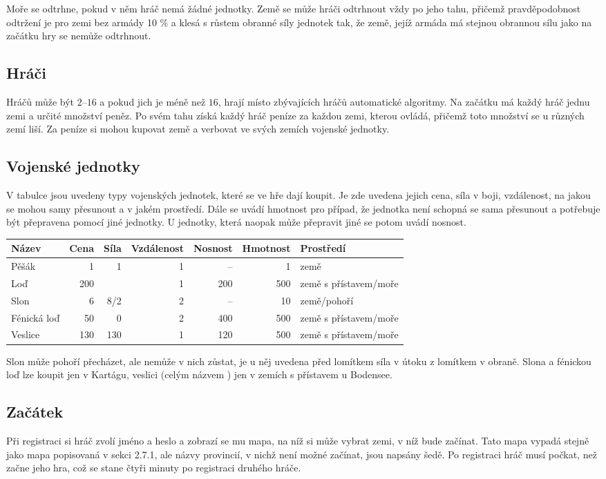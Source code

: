 \documentclass[a4paper,12pt]{article}
\begin{document}
Moře se odtrhne, pokud v něm hráč nemá žádné jednotky. Země se může hráči odtrhnout vždy po jeho tahu, přičemž pravděpodobnost odtržení je pro zemi bez armády 10 \% a klesá s růstem obranné síly jednotek tak, že země, jejíž armáda má stejnou obrannou sílu jako na začátku hry se nemůže odtrhnout.
\subsection{Hráči}
Hráčů může být $2$--$16$ a pokud jich je méně než $16$, hrají místo zbývajících hráčů automatické algoritmy. Na začátku má každý hráč jednu zemi a určité množství peněz. Po svém tahu získá každý hráč peníze za každou zemi, kterou ovládá, přičemž toto množství se u různých zemí liší. Za peníze si mohou kupovat země a verbovat ve svých zemích vojenské jednotky.
\subsection{Vojenské jednotky}
V tabulce jsou uvedeny typy vojenských jednotek, které se ve hře dají koupit. Je zde uvedena jejich cena, síla v boji, vzdálenost, na jakou se mohou samy přesunout a v jakém prostředí. Dále se uvádí hmotnost pro případ, že jednotka není schopná se sama přesunout a potřebuje být přepravena pomocí jiné jednotky. U jednotky, která naopak může přepravit jiné se potom uvádí nosnost.

\begin{tabular}{l r r r r r l}
Název		& Cena	& Síla	& Vzdálenost	&Nosnost& Hmotnost	& Prostředí\\ \hline
Pěšák		& 1		& 1		& 1			& --		& 1			& země\\
Loď			& 200	& 		& 1			& 200	& 500		& země s přístavem/moře\\
Slon			& 6		& 8/2	& 2			& --		& 10			& země/pohoří\\
Fénická loď	& 50		& 0		& 2			& 400	& 500		& země s přístavem/moře\\
Veslice		& 130	& 130	& 1			& 120	& 500		& země s přístavem/moře\\
\end{tabular}

Slon může pohoří přecházet, ale nemůže v nich zůstat, je u něj uvedena před lomítkem síla v útoku z lomítkem v obraně. Slona a fénickou loď lze koupit jen v Kartágu, veslici (celým názvem ) jen v zemích s přístavem u Bodensee.

\subsection{Začátek}
Při registraci si hráč zvolí jméno a heslo a zobrazí se mu mapa, na níž si může vybrat zemi, v níž bude začínat. Tato mapa vypadá stejně jako mapa popisovaná v sekci 2.7.1, ale názvy provincií, v nichž není možné začínat, jsou napsány šedě. Po registraci hráč musí počkat, než začne jeho hra, což se stane čtyři minuty po registraci druhého hráče.
\end{document}
